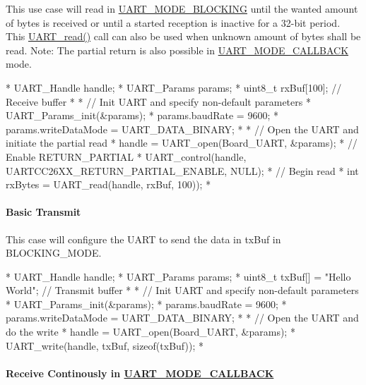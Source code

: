 This use case will read in \hyperlink{_u_a_r_t_8h_a2507a620dba95cd20885c52494d19e90ae6b6bd5d2d5df859ad6724e89e605ebf}{U\-A\-R\-T\-\_\-\-M\-O\-D\-E\-\_\-\-B\-L\-O\-C\-K\-I\-N\-G} until the wanted amount of bytes is received or until a started reception is inactive for a 32-\/bit period. This \hyperlink{_u_a_r_t_8h_a023152d57539cad94bdd813956013e73}{U\-A\-R\-T\-\_\-read()} call can also be used when unknown amount of bytes shall be read. Note\-: The partial return is also possible in \hyperlink{_u_a_r_t_8h_a2507a620dba95cd20885c52494d19e90ae0dbd9b5195e56c3c2aed10163523754}{U\-A\-R\-T\-\_\-\-M\-O\-D\-E\-\_\-\-C\-A\-L\-L\-B\-A\-C\-K} mode. 
\begin{DoxyCode}
*  UART_Handle handle;
*  UART_Params params;
*  uint8\_t rxBuf[100];      \textcolor{comment}{// Receive buffer}
*
*  \textcolor{comment}{// Init UART and specify non-default parameters}
*  UART_Params_init(&params);
*  params.baudRate      = 9600;
*  params.writeDataMode = UART_DATA_BINARY;
*
*  \textcolor{comment}{// Open the UART and initiate the partial read}
*  handle = UART_open(Board\_UART, &params);
*  \textcolor{comment}{// Enable RETURN\_PARTIAL}
*  UART_control(handle, UARTCC26XX_RETURN_PARTIAL_ENABLE, NULL);
*  \textcolor{comment}{// Begin read}
*  \textcolor{keywordtype}{int} rxBytes = UART_read(handle, rxBuf, 100));
*  
\end{DoxyCode}


\paragraph*{Basic Transmit}

This case will configure the U\-A\-R\-T to send the data in tx\-Buf in B\-L\-O\-C\-K\-I\-N\-G\-\_\-\-M\-O\-D\-E. 
\begin{DoxyCode}
*  UART_Handle handle;
*  UART_Params params;
*  uint8\_t txBuf[] = \textcolor{stringliteral}{"Hello World"};    \textcolor{comment}{// Transmit buffer}
*
*  \textcolor{comment}{// Init UART and specify non-default parameters}
*  UART_Params_init(&params);
*  params.baudRate      = 9600;
*  params.writeDataMode = UART_DATA_BINARY;
*
*  \textcolor{comment}{// Open the UART and do the write}
*  handle = UART_open(Board\_UART, &params);
*  UART_write(handle, txBuf, \textcolor{keyword}{sizeof}(txBuf));
*  
\end{DoxyCode}


\paragraph*{Receive Continously in \hyperlink{_u_a_r_t_8h_a2507a620dba95cd20885c52494d19e90ae0dbd9b5195e56c3c2aed10163523754}{U\-A\-R\-T\-\_\-\-M\-O\-D\-E\-\_\-\-C\-A\-L\-L\-B\-A\-C\-K}\label{_u_a_r_t_c_c26_x_x_8h_USE_CASE_CB}%
\hypertarget{_u_a_r_t_c_c26_x_x_8h_USE_CASE_CB}{}%
}

